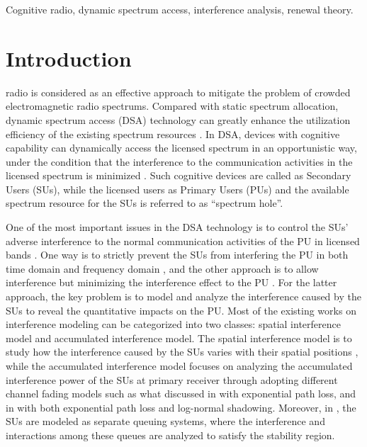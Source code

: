 \documentclass[11pt,draftcls]{IEEEtran}{\onecolumn}
\begin{document}
\begin{IEEEkeywords}
Cognitive radio, dynamic spectrum access, interference analysis,
renewal theory.
\end{IEEEkeywords}

\IEEEpeerreviewmaketitle
\newpage
\section{Introduction}


 radio is considered as an effective
approach to mitigate the problem of crowded electromagnetic radio
spectrums. Compared with static spectrum allocation, dynamic
spectrum access (DSA) technology can greatly enhance the utilization
efficiency of the existing spectrum resources \cite{16}. In DSA,
devices with cognitive capability can dynamically access the
licensed spectrum in an opportunistic way, under the condition that
the interference to the communication activities in the licensed
spectrum is minimized \cite{17}. Such cognitive devices are called
as Secondary Users (SUs), while the licensed users as Primary Users
(PUs) and the available spectrum resource for the SUs is referred to
as ``spectrum hole''.

One of the most important issues in the DSA technology is to control
the SUs' adverse interference to the normal communication activities
of the PU in licensed bands \cite{18}. One way is to strictly
prevent the SUs from interfering the PU in both time domain and
frequency domain \cite{19}, and the other approach is to allow
interference but minimizing the interference effect to the PU
\cite{0}. For the latter approach, the key problem is to model and
analyze the interference caused by the SUs to reveal the
quantitative impacts on the PU. Most of the existing works on
interference modeling can be categorized into two classes: spatial
interference model and accumulated interference model. The spatial
interference model is to study how the interference caused by the
SUs varies with their spatial positions \cite{3}\cite{2}\cite{1},
while the accumulated interference model focuses on analyzing the
accumulated interference power of the SUs at primary receiver
through adopting different channel fading models such as what
discussed in \cite{5}\cite{6} with exponential path loss, and in
\cite{7}\cite{10}\cite{8} with both exponential path loss and
log-normal shadowing. Moreover, in
\cite{20}\cite{21}\cite{22}\cite{23}, the SUs are modeled as
separate queuing systems, where the interference and interactions
among these queues are analyzed to satisfy the stability region.
\end{document}
